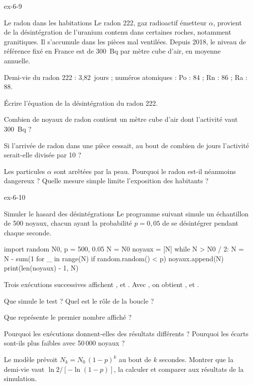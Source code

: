 \begin{blocLivre}{ex-6-9}
\begin{exercice}[2]{Le radon dans les habitations}
Le radon 222, gaz radioactif émetteur $\alpha$, provient de la désintégration de l'uranium contenu dans certaines
roches, notamment granitiques. Il s'accumule dans les pièces mal ventilées. Depuis 2018, le niveau de référence
fixé en France est de 300~Bq par mètre cube d'air, en moyenne annuelle.
\begin{donnees}
Demi-vie du radon 222 : 3,82~jours ; numéros atomiques : Po : 84 ; Rn : 86 ; Ra : 88.
\end{donnees}
\begin{questions}
\item Écrire l'équation de la désintégration du radon 222.
\item Combien de noyaux de radon contient un mètre cube d'air dont l'activité vaut \qty{300}{Bq} ?
\item Si l'arrivée de radon dans une pièce cessait, au bout de combien de jours l'activité serait-elle divisée par 10 ?
\item Les particules $\alpha$ sont arrêtées par la peau. Pourquoi le radon est-il néanmoins dangereux ? Quelle mesure
simple limite l'exposition des habitants ?
\end{questions}
\end{exercice}
\end{blocLivre}
\begin{blocLivre}{ex-6-10}
\begin{exercice}[2]{Simuler le hasard des désintégrations}
Le programme suivant simule un échantillon de 500 noyaux, chacun ayant la probabilité $p=0{,}05$ de se désintégrer
pendant chaque seconde.
\begin{python}
import random
N0, p = 500, 0.05
N = N0
noyaux = [N]
while N > N0 / 2:
    N = N - sum(1 for _ in range(N) if random.random() < p)
    noyaux.append(N)
print(len(noyaux) - 1, N)
\end{python}
Trois exécutions successives affichent ,  et . Avec , on
obtient ,  et .
\begin{questions}
\item {}Que simule le test  ? Quel est le rôle de la boucle  ?
\item Que représente le premier nombre affiché ?
\item Pourquoi les exécutions donnent-elles des résultats différents ? Pourquoi les écarts sont-ils plus faibles avec 50\,000 noyaux ?
\item Le modèle prévoit $N_k=N_0\,(1-p)^k$ au bout de $k$ secondes. Montrer que la demi-vie vaut
$\ln2/[-\ln(1-p)]$, la calculer et comparer aux résultats de la simulation.
\end{questions}
\end{exercice}
\end{blocLivre}
